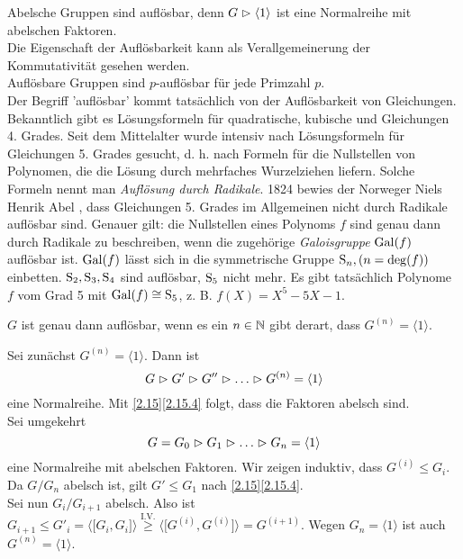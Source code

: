 \begin{bemerkung}
 Abelsche Gruppen sind aufl\"osbar, denn $G\vartriangleright \langle 1 \rangle$ ist eine Normalreihe mit abelschen Faktoren.\\
Die Eigenschaft der Aufl\"osbarkeit kann als Verallgemeinerung der Kommutativit\"at gesehen werden.\\
Aufl\"osbare Gruppen sind $p$-aufl\"osbar f\"ur jede Primzahl $p$.\\
Der Begriff 'aufl\"osbar' kommt tats\"achlich von der Aufl\"osbarkeit von Gleichungen. Bekanntlich gibt es L\"osungsformeln f\"ur quadratische, kubische und Gleichungen 4. Grades. Seit dem Mittelalter wurde intensiv nach L\"osungsformeln f\"ur Gleichungen 5. Grades gesucht, d. h. nach Formeln f\"ur die Nullstellen von Polynomen, die die L\"osung durch mehrfaches Wurzelziehen liefern. Solche Formeln nennt man \emph{Aufl\"osung durch Radikale}. 1824 bewies der Norweger Niels Henrik Abel , dass Gleichungen 5. Grades im Allgemeinen nicht durch Radikale aufl\"osbar sind. Genauer gilt: die Nullstellen eines Polynoms $f$ sind genau dann durch Radikale zu beschreiben, wenn die zugeh\"orige \emph{Galoisgruppe} $\operatorname{Gal}(f)$ aufl\"osbar ist.
$\operatorname{Gal}(f)$ l\"asst sich in die symmetrische Gruppe $\operatorname{S}_n, (n=\deg(f))$ einbetten. $\operatorname{S}_2, \operatorname{S}_3, \operatorname{S}_4$ sind aufl\"osbar, $\operatorname{S}_5$ nicht mehr. Es gibt tats\"achlich Polynome $f$ vom Grad 5 mit $\operatorname{Gal}(f)\cong \operatorname{S}_5$, z. B. $f(X)=X^5-5X-1$.
\end{bemerkung}

\begin{satz} \label{6.10}
 $G$ ist genau dann aufl\"osbar, wenn es ein $n\in \mathbb{N}$ gibt derart, dass $G^{(n)}=\langle 1 \rangle$.
\end{satz}

\begin{beweis}
 Sei zun\"achst $G^(n)=\langle 1 \rangle$. Dann ist $$G\vartriangleright G'\vartriangleright G''\vartriangleright\ldots\vartriangleright G^{(n)}=\langle 1 \rangle$$ eine Normalreihe. Mit \ref{2.15}\ref{2.15.4} folgt, dass die Faktoren abelsch sind.\\
Sei umgekehrt $$G=G_0\vartriangleright G_1\vartriangleright\ldots\vartriangleright G_n= \langle 1 \rangle$$ eine Normalreihe mit abelschen Faktoren. Wir zeigen induktiv, dass $G^{(i)}\leq G_i$.
Da $G/G_n$ abelsch ist, gilt $G'\leq G_1$ nach \ref{2.15}\ref{2.15.4}. \\
Sei nun $G_i/G_{i+1}$ abelsch. Also ist $G_{i+1}\leq G'_i= \langle \lbrack G_i, G_i \rbrack \rangle \stackrel{\text{I.V.}}{\geq}\langle \lbrack G^{(i)},G^{(i)}\rbrack\rangle = G^{(i+1)}$.
Wegen $G_n=\langle 1\rangle $ ist auch $G^{(n)}=\langle 1\rangle$.
\end{beweis}

